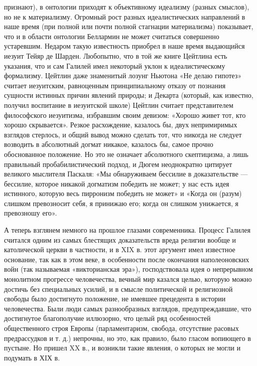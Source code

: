 признают), в онтологии приходят к объективному идеализму (разных смыслов), но
не к материализму. Огромный рост разных идеалистических направлений в наше
время (при полной или почти полной стагнации материализма) показывает, что и в
области онтологии Беллармин не может считаться совершенно устаревшим. Недаром
такую известность приобрел в наше время выдающийся иезуит Тейяр де Шарден.
Любопытно, что в той же книге Цейтлина есть указания, что и сам Галилей имел
некоторый уклон к идеалистическому формализму. Цейтлин даже знаменитый лозунг
Ньютона «Не делаю гипотез» считает иезуитским, равноценным принципиальному
отказу от познания сущности истинных причин явлений природы; и Декарта
(который, как известно, получил воспитание в иезуитской школе) Цейтлин считает
представителем философского иезуитизма, избравшим своим девизом: «Хорошо живет
тот, кто хорошо скрывается». Резкое расхождение, казалось бы, двух непримиримых
взглядов стерлось, и общий вывод можно сделать тот, что никогда не следует
возводить в абсолютный догмат никакое, казалось бы, самое прочно обоснованное
положение. Но это не означает абсолютного скептицизма, а лишь правильный
пробабилистический подход, и Дюгем неоднократно цитирует великого мыслителя
Паскаля: «Мы обнаруживаем бессилие в доказательстве --- бессилие, которое никакой
догматизм победить не может; у нас есть идея истинного, которую весь пирронизм
победить не может» и «Когда он (разум) слишком превозносит себя, я принижаю
его; когда он слишком унижается, я превозношу его».

А теперь взглянем немного на прошлое глазами современника. Процесс
Галилея считался одним из самых блестящих доказательств вреда религии
вообще и католической церкви в частности, и в XIX в. этот аргумент
имел известное основание, так как в этом веке, в особенности после
окончания наполеоновских войн (так называемая «викторианская эра»),
господствовала идея о непрерывном монолитном прогрессе человечества,
вечный мир казался целью, которую можно достичь без специальных
усилий, и в смысле политической и религиозной свободы было достигнуто
положение, не имевшее прецедента в истории человечества. Были
люди самых разнообразных взглядов, предупреждавшие, что достигнутое
благополучие иллюзорно, что целый ряд особенностей общественного строя
Европы (парламентаризм, свобода, отсутствие расовых предрассудков и т.
д.) непрочны, но это, как правило, было гласом вопиющего в пустыне. Но
пришел XX в., и возникли такие явления, о которых не могли и подумать
в ХIХ в.
